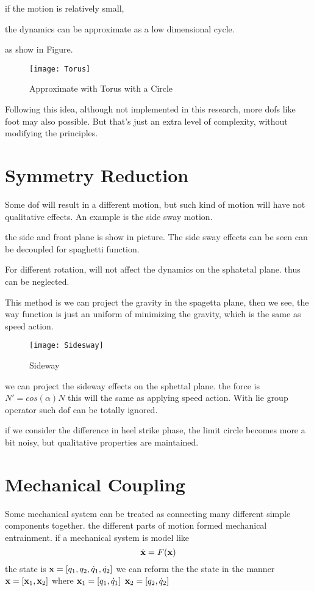 if the motion is relatively small,

the dynamics can be approximate as a low dimensional cycle.

as show in Figure.

\begin{figure}[!htbp]
  \begin{center}
      \texttt{[image: Torus]}
    \caption{Approximate with Torus with a Circle}
    \label{fig:approximate}
\end{center}
\end{figure}


Following this idea, although not implemented in this research, more dofs like foot may also possible.
But that's just an extra level of complexity, without modifying the principles. 
\section{Symmetry Reduction}
Some dof will result in a different motion, but such kind of motion will have not qualitative effects.
An example is the side sway motion.

the side and front plane is show in picture.
The side sway effects can be seen can be decoupled for spaghetti function.


For different rotation, will not affect the dynamics on the sphatetal plane.
thus can be neglected.

This method is we can project the gravity in the spagetta plane,
then we see, the way function is just an uniform of minimizing the gravity,
which is the same as speed action.

\begin{figure}[!htbp]
  \begin{center}
      \texttt{[image: Sidesway]}
    \caption{Sideway}
    \label{fig:sidesway}
\end{center}
\end{figure}


we can project the sideway effects on the sphettal plane. the force is $N'=cos(\alpha)N$
this will the same as applying speed action.
With lie group operator such dof can be totally ignored.


if we consider the difference in heel strike phase,
the limit circle becomes more a bit noisy, but qualitative properties are maintained.

\section{Mechanical Coupling}
Some mechanical system can be treated as connecting many different simple components together.
the different parts of motion formed mechanical entrainment.
if a mechanical system is model like
\[
\dot{\mathbf{x}}=F(\mathbf{x})
\]
the state is $\mathbf{x}=[q_1,q_2,\dot{q}_1,\dot{q}_2]$
we can reform the the state in the manner
$\mathbf{x}=[\mathbf{x}_1,\mathbf{x}_2]$
where
$\mathbf{x}_1=[q_1,\dot{q}_1]$
$\mathbf{x}_2=[q_2,\dot{q}_2]$

